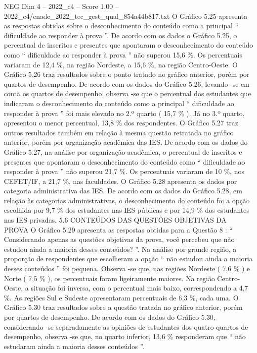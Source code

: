 \begin{textsample}{NEG Dim 4 – 2022\_c4 – Score 1.00 – 2022\_c4/enade\_2022\_tec\_gest\_qual\_854a44b817.txt}
O Gráfico 5.25 apresenta as respostas obtidas sobre o desconhecimento do conteúdo como a principal “ dificuldade ao responder à prova ”.
De acordo com os dados o Gráfico 5.25, o percentual de inscritos e presentes que apontaram o desconhecimento do conteúdo como “ dificuldade ao responder à prova ” não superou 15,6 \%.
Os percentuais variaram de 12,4 \%, na região Nordeste, a 15,6 \%, na região Centro-Oeste.
O Gráfico 5.26 traz resultados sobre o ponto tratado no gráfico anterior, porém por quartos de desempenho.
De acordo com os dados do Gráfico 5.26, levando -se em conta os quartos de desempenho, observa -se que o percentual dos estudantes que indicaram o desconhecimento do conteúdo como a principal “ dificuldade ao responder à prova ” foi mais elevado no 2.º quarto ( 15,7 \% ).
Já no 3.º quarto, apresentou o menor percentual, 13,8 \% dos respondentes.
O Gráfico 5.27 traz outros resultados também em relação à mesma questão retratada no gráfico anterior, porém por organização acadêmica das IES.
De acordo com os dados do Gráfico 5.27, na análise por organização acadêmica, o percentual de inscritos e presentes que apontaram o desconhecimento do conteúdo como “ dificuldade ao responder à prova ” não superou 21,7 \%.
Os percentuais variaram de 10 \%, nos CEFET/IF, a 21,7 \%, nas faculdades.
O Gráfico 5.28 apresenta os dados por categoria administrativa das IES.
De acordo com os dados do Gráfico 5.28, em relação às categorias administrativas, o desconhecimento do conteúdo foi a opção escolhida por 9,7 \% dos estudantes nas IES públicas e por 14,9 \% dos estudantes nas IES privadas. 5.6 CONTEÚDOS DAS QUESTÕES OBJETIVAS DA PROVA O Gráfico 5.29 apresenta as respostas obtidas para a Questão 8 : “ Considerando apenas as questões objetivas da prova, você percebeu que não estudou ainda a maioria desses conteúdos? ”.
Na análise por grande região, a proporção de respondentes que escolheram a opção “ não estudou ainda a maioria desses conteúdos ” foi pequena.
Observa -se que, nas regiões Nordeste ( 7,6 \% ) e Norte ( 7,5 \% ), os percentuais foram ligeiramente maiores.
Na região Centro-Oeste, a situação foi inversa, com o percentual mais baixo, correspondendo a 4,7 \%.
As regiões Sul e Sudeste apresentaram percentuais de 6,3 \%, cada uma.
O Gráfico 5.30 traz resultados sobre a questão tratada no gráfico anterior, porém por quartos de desempenho.
De acordo com os dados do Gráfico 5.30, considerando -se separadamente as opiniões de estudantes dos quatro quartos de desempenho, observa -se que, no quarto inferior, 13,6 \% responderam que “ não estudaram ainda a maioria desses conteúdos ”.

\end{textsample}
